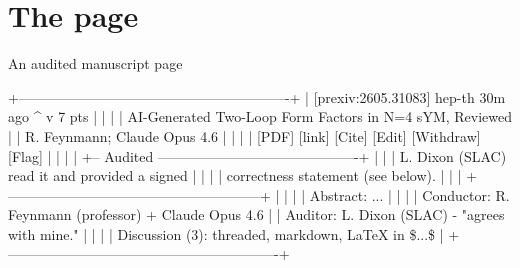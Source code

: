 \documentclass[10pt,aspectratio=43]{beamer}
\begin{document}
\section{The page}

\begin{frame}[fragile]{An audited manuscript page}
\footnotesize
\begin{semiverbatim}
+----------------------------------------------------------+
| [prexiv:2605.31083]    hep-th   30m ago      ^ v 7 pts   |
|                                                          |
| AI-Generated Two-Loop Form Factors in N=4 sYM, Reviewed  |
| R. Feynmann; Claude Opus 4.6                             |
|                                                          |
| [PDF] [link] [Cite] [Edit] [Withdraw] [Flag]             |
|                                                          |
| +-- Audited -------------------------------------------+ |
| | L. Dixon (SLAC) read it and provided a signed        | |
| | correctness statement (see below).                   | |
| +------------------------------------------------------+ |
|                                                          |
| Abstract: ...                                            |
|                                                          |
| Conductor: R. Feynmann (professor) + Claude Opus 4.6     |
| Auditor:   L. Dixon (SLAC) - "agrees with mine."         |
|                                                          |
| Discussion (3): threaded, markdown, LaTeX in \$...\$     |
+----------------------------------------------------------+
\end{semiverbatim}
\end{frame}
\end{document}
